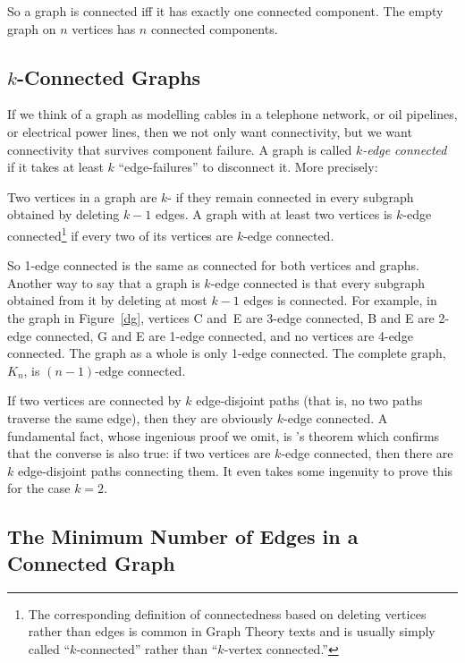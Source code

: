 So a graph is connected iff it has exactly one
connected component.  The empty graph on $n$ vertices has $n$
connected components.

\subsection{$k$-Connected Graphs}

If we think of a graph as modelling cables in a telephone network, or
oil pipelines, or electrical power lines, then we not only want
connectivity, but we want connectivity that survives component
failure.  A graph is called \emph{$k$-edge connected} if it takes at
least $k$ ``edge-failures'' to disconnect it.  More precisely:

\begin{definition}
  Two vertices in a graph are $k$- if they remain
  connected in every subgraph obtained by deleting $k-1$ edges.  A graph
  with at least two vertices is $k$-edge connected\footnote{The
    corresponding definition of connectedness based on deleting vertices
    rather than edges is common in Graph Theory texts and is usually
    simply called ``$k$-connected'' rather than ``$k$-vertex connected.''}
  if every two of its vertices are $k$-edge connected.
\end{definition}

So 1-edge connected is the same as connected for both vertices and
graphs.  Another way to say that a graph is $k$-edge connected is that
every subgraph obtained from it by deleting at most $k-1$ edges is
connected.  For example, in the graph in Figure~\ref{dg}, vertices C
and~E are 3-edge connected, B and E are 2-edge connected, G and E are
1-edge connected, and no vertices are 4-edge connected.  The graph as
a whole is only 1-edge connected.  The complete graph, $K_n$, is
$(n-1)$-edge connected.

If two vertices are connected by $k$ edge-disjoint paths (that is, no
two paths traverse the same edge), then they are obviously $k$-edge
connected.  A fundamental fact, whose ingenious proof we omit,
is 's theorem which confirms that the converse is also
true: if two vertices are $k$-edge connected, then there are $k$
edge-disjoint paths connecting them.  It even takes some ingenuity to
prove this for the case $k=2$.

\subsection{The Minimum Number of Edges in a Connected Graph}

